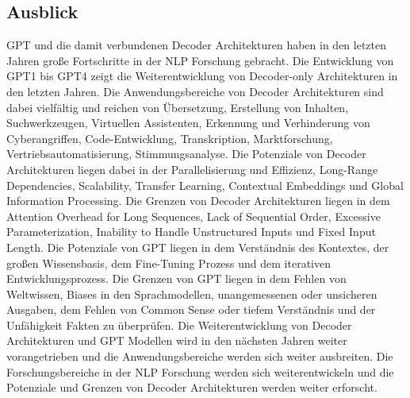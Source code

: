 \documentclass[conference]{IEEEtran}
\begin{document}
\subsection{Ausblick}
GPT und die damit verbundenen Decoder Architekturen haben in den letzten Jahren große Fortschritte in der NLP Forschung gebracht. Die Entwicklung von GPT1 bis GPT4 zeigt die Weiterentwicklung von Decoder-only Architekturen in den letzten Jahren. Die Anwendungsbereiche von Decoder Architekturen sind dabei vielfältig und reichen von Übersetzung, Erstellung von Inhalten, Suchwerkzeugen, Virtuellen Assistenten, Erkennung und Verhinderung von Cyberangriffen, Code-Entwicklung, Transkription, Marktforschung, Vertriebsautomatisierung, Stimmungsanalyse. Die Potenziale von Decoder Architekturen liegen dabei in der Parallelisierung und Effizienz, Long-Range Dependencies, Scalability, Transfer Learning, Contextual Embeddings und Global Information Processing. Die Grenzen von Decoder Architekturen liegen in dem Attention Overhead for Long Sequences, Lack of Sequential Order, Excessive Parameterization, Inability to Handle Unstructured Inputs und Fixed Input Length. Die Potenziale von GPT liegen in dem Verständnis des Kontextes, der großen Wissensbasis, dem Fine-Tuning Prozess und dem iterativen Entwicklungsprozess. Die Grenzen von GPT liegen in dem Fehlen von Weltwissen, Biases in den Sprachmodellen, unangemessenen oder unsicheren Ausgaben, dem Fehlen von Common Sense oder tiefem Verständnis und der Unfähigkeit Fakten zu überprüfen. Die Weiterentwicklung von Decoder Architekturen und GPT Modellen wird in den nächsten Jahren weiter vorangetrieben und die Anwendungsbereiche werden sich weiter ausbreiten. Die Forschungsbereiche in der NLP Forschung werden sich weiterentwickeln und die Potenziale und Grenzen von Decoder Architekturen werden weiter erforscht.





\end{document}
